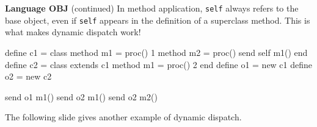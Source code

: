 \begin{minipage}[t]{\sw}
\slidenumber
\LARGE
{\bf Language OBJ} (continued)\exx
In method application, \verb'self' always refers to the base object,
even if \verb'self' appears in the definition of a superclass method.
This is what makes dynamic dispatch work!
\Large
\begin{qv}
define c1 =
  class
    method m1 = proc() 1
    method m2 = proc() send self m1()
  end
define c2 =
  class extends c1
    method m1 = proc() 2
  end
define o1 = new c1
define o2 = new c2

send o1 m1()  %
send o2 m1()  %
send o2 m2()  %
\end{qv}
\LARGE
The following slide gives another example of dynamic dispatch.
\end{minipage}
